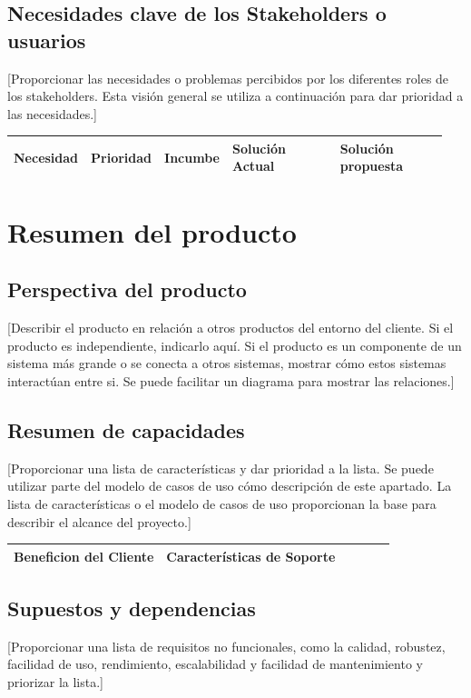\documentclass[11pt]{article}
\begin{document}
\subsection{Necesidades clave de los Stakeholders o usuarios}
[Proporcionar las necesidades o problemas percibidos por los diferentes roles de los stakeholders. Esta visión general se utiliza a continuación para dar prioridad a las necesidades.]
          
\begin{table}[H]
  \centering
  \begin{tabular}{p{0.15\linewidth}p{0.15\linewidth}p{0.15\linewidth}p{0.25\linewidth}p{0.25\linewidth}}
    \toprule
    \textbf{Necesidad} & \textbf{Prioridad} & \textbf{Incumbe} & \textbf{Solución Actual} & \textbf{Solución propuesta} \\
    \midrule
    \bottomrule
  \end{tabular}
\end{table}
\newpage

\section{Resumen del producto}
\subsection{Perspectiva del producto}
[Describir el producto en relación a otros productos del entorno del cliente. Si el producto es independiente, indicarlo aquí. Si el producto es un componente de un sistema más grande o se conecta a otros sistemas, mostrar cómo estos sistemas interactúan entre si. Se puede facilitar un diagrama para mostrar las relaciones.]

\subsection{Resumen de capacidades}
[Proporcionar una lista de características y dar prioridad a la lista. Se puede utilizar parte del modelo de casos de uso cómo descripción de este apartado. La lista de características o el modelo de casos de uso proporcionan la base para describir el alcance del proyecto.]

\begin{table}[H]
  \centering
  \begin{tabular}{p{0.4\linewidth}p{0.6\linewidth}}
    \toprule
    \textbf{Beneficion del Cliente} & \textbf{Características de Soporte} \\
    \midrule
    \bottomrule
  \end{tabular}
\end{table}

\subsection{Supuestos y dependencias}
[Proporcionar una lista de requisitos no funcionales, como la calidad, robustez, facilidad de uso, rendimiento, escalabilidad y facilidad de mantenimiento y priorizar la lista.]
\end{document}

